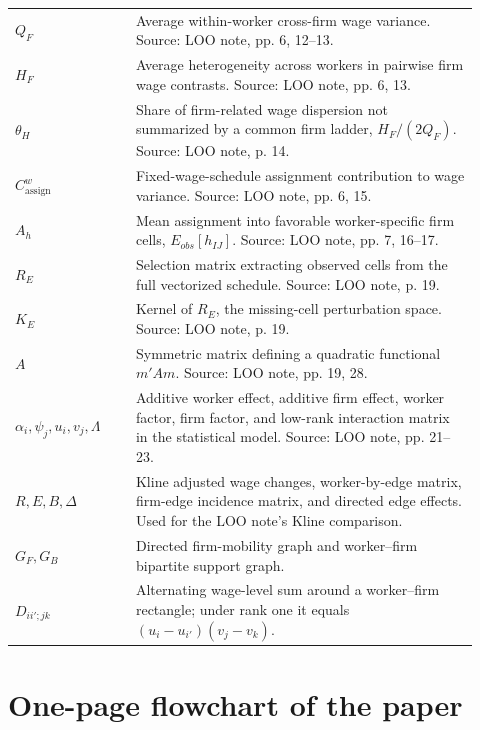 \documentclass[11pt]{article}
\begin{document}
\begin{longtable}{>{\raggedright\arraybackslash}p{0.24\linewidth}
                  >{\raggedright\arraybackslash}p{0.68\linewidth}}
\(Q_F\) & Average within-worker cross-firm wage variance. Source: LOO note, pp. 6, 12--13. \\
\(H_F\) & Average heterogeneity across workers in pairwise firm wage contrasts. Source: LOO note, pp. 6, 13. \\
\(\theta_H\) & Share of firm-related wage dispersion not summarized by a common firm ladder, \(H_F/(2Q_F)\). Source: LOO note, p. 14. \\
\(C^w_{\mathrm{assign}}\) & Fixed-wage-schedule assignment contribution to wage variance. Source: LOO note, pp. 6, 15. \\
\(A_h\) & Mean assignment into favorable worker-specific firm cells, \(E_{obs}[h_{IJ}]\). Source: LOO note, pp. 7, 16--17. \\
\(R_E\) & Selection matrix extracting observed cells from the full vectorized schedule. Source: LOO note, p. 19. \\
\(K_E\) & Kernel of \(R_E\), the missing-cell perturbation space. Source: LOO note, p. 19. \\
\(A\) & Symmetric matrix defining a quadratic functional \(m'Am\). Source: LOO note, pp. 19, 28. \\
\(\alpha_i,\psi_j,u_i,v_j,\Lambda\) & Additive worker effect, additive firm effect, worker factor, firm factor, and low-rank interaction matrix in the statistical model. Source: LOO note, pp. 21--23. \\
\(R,E,B,\Delta\) & Kline adjusted wage changes, worker-by-edge matrix, firm-edge incidence matrix, and directed edge effects. Used for the LOO note's Kline comparison. \\
\(G_F,G_B\) & Directed firm-mobility graph and worker--firm bipartite support graph. \\
\(D_{ii';jk}\) & Alternating wage-level sum around a worker--firm rectangle; under rank one it equals \((u_i-u_{i'})(v_j-v_k)\). \\
\bottomrule
\end{longtable}

\section{One-page flowchart of the paper}
\end{document}
